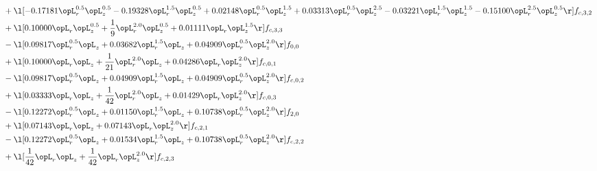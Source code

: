 \begin{alignat}{2}
& + \l[  -0.17181 \opL_r^{0.5} \opL_z^{0.5}   -0.19328 \opL_r^{1.5} \opL_z^{0.5} +  0.02148 \opL_r^{0.5} \opL_z^{1.5} +  0.03313 \opL_r^{0.5} \opL_z^{2.5}   -0.03221 \opL_r^{1.5} \opL_z^{1.5}   -0.15100 \opL_r^{2.5} \opL_z^{0.5}  \r] f_{c,3,2} \nonumber \\ 
& + \l[  0.10000 \opL_r \opL_z^{0.5} + \frac{1}{9} \opL_r^{2.0} \opL_z^{0.5} +  0.01111 \opL_r \opL_z^{1.5}  \r] f_{c,3,3} \nonumber \\ 
& - \l[  0.09817 \opL_r^{0.5} \opL_z +  0.03682 \opL_r^{1.5} \opL_z +  0.04909 \opL_r^{0.5} \opL_z^{2.0}  \r] f_{0,0} \nonumber \\ 
& + \l[  0.10000 \opL_r \opL_z + \frac{1}{21} \opL_r^{2.0} \opL_z +  0.04286 \opL_r \opL_z^{2.0}  \r] f_{c,0,1} \nonumber \\ 
& - \l[  0.09817 \opL_r^{0.5} \opL_z +  0.04909 \opL_r^{1.5} \opL_z +  0.04909 \opL_r^{0.5} \opL_z^{2.0}  \r] f_{c,0,2} \nonumber \\ 
& + \l[  0.03333 \opL_r \opL_z + \frac{1}{42} \opL_r^{2.0} \opL_z +  0.01429 \opL_r \opL_z^{2.0}  \r] f_{c,0,3} \nonumber \\ 
& - \l[  0.12272 \opL_r^{0.5} \opL_z +  0.01150 \opL_r^{1.5} \opL_z +  0.10738 \opL_r^{0.5} \opL_z^{2.0}  \r] f_{2,0} \nonumber \\ 
& + \l[  0.07143 \opL_r \opL_z +  0.07143 \opL_r \opL_z^{2.0}  \r] f_{c,2,1} \nonumber \\ 
& - \l[  0.12272 \opL_r^{0.5} \opL_z +  0.01534 \opL_r^{1.5} \opL_z +  0.10738 \opL_r^{0.5} \opL_z^{2.0}  \r] f_{c,2,2} \nonumber \\ 
& + \l[ \frac{1}{42} \opL_r \opL_z + \frac{1}{42} \opL_r \opL_z^{2.0}  \r] f_{c,2,3} \nonumber \\ 
\end{alignat} 


